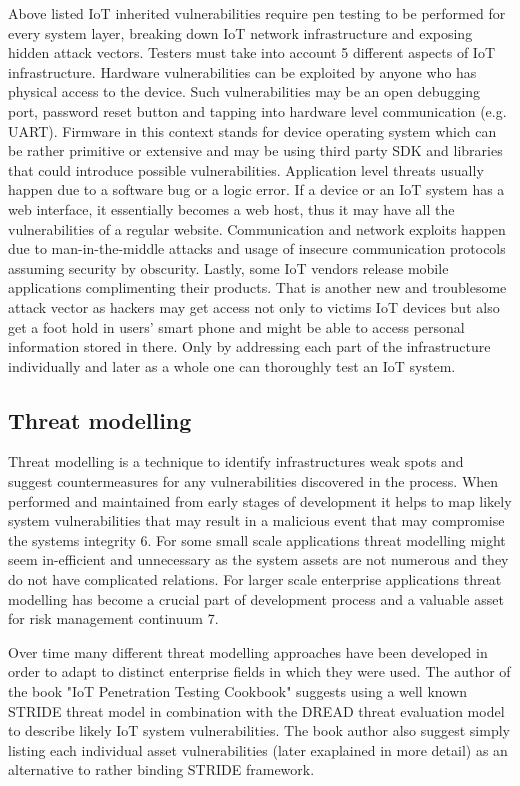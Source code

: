 Above listed IoT inherited vulnerabilities require pen testing to be performed for every system layer, breaking down IoT network infrastructure and exposing hidden attack vectors. Testers must take into account 5 different aspects of IoT infrastructure. Hardware vulnerabilities can be exploited by anyone who has physical access to the device. Such vulnerabilities may be an open debugging port, password reset button and tapping into hardware level communication (e.g. UART)\cite{attify}. Firmware in this context stands for device operating system which can be rather primitive or extensive and may be using third party SDK and libraries that could introduce possible vulnerabilities\cite {cookbook}. Application level threats usually happen due to a software bug or a logic error\cite{cookbook}. If a device or an IoT system has a web interface, it essentially becomes a web host, thus it may have all the vulnerabilities of a regular website\cite{2007:WAH:1406550}. Communication and network exploits happen due to man-in-the-middle attacks and usage of insecure communication protocols assuming security by obscurity. Lastly, some IoT vendors release mobile applications complimenting their products. That is another new and troublesome attack vector as hackers may get access not only to victims IoT devices but also get a foot hold in users' smart phone and might be able to access personal information stored in there\cite{cookbook}. Only by addressing each part of the infrastructure individually and later as a whole one can thoroughly test an IoT system.

\subsection{Threat modelling}\label{iot-threat-modelling}

Threat modelling is a technique to identify infrastructures weak spots and suggest countermeasures for any vulnerabilities discovered in the process. When performed and maintained from early stages of development it helps to map likely system vulnerabilities that may result in a malicious event that may compromise the systems integrity {6}. For some small scale applications threat modelling might seem in-efficient and unnecessary as the system assets are not numerous and they do not have complicated relations. For larger scale enterprise applications threat modelling has become a crucial part of development process and a valuable asset for risk management continuum {7}. 

Over time many different threat modelling approaches have been developed in order to adapt to distinct enterprise fields in which they were used. The author of the book "IoT Penetration Testing Cookbook"\cite{cookbook} suggests using a well known STRIDE threat model in combination with the DREAD threat evaluation model to describe likely IoT system vulnerabilities. The book author also suggest simply listing each individual asset vulnerabilities (later exaplained in more detail) as an alternative to rather binding STRIDE framework\cite{cookbook}.

